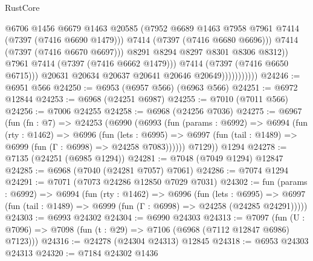 \begin{lexlean}{RustCore}
\begin{coremodule}
                                      @6706
                                      @1456
                                      @6679
                                      @1463
                                      @20585
                                      (@7952
                                        @6689
                                        @1463
                                        @7958
                                        @7961
                                        @7414
                                        (@7397 (@7416 @6690 @1479)))
                                      @7414
                                      (@7397 (@7416 @6680 @6696)))
                                    @7414
                                    (@7397 (@7416 @6670 @6697)))
                                  @8291
                                  @8294
                                  @8297
                                  @8301
                                  @8306
                                  @8312))
                              @7961
                              @7414
                              (@7397 (@7416 @6662 @1479)))
                            @7414
                            (@7397 (@7416 @6650 @6715)))
                          @20631
                          @20634
                          @20637
                          @20641
                          @20646
                          @20649)))))))))))
@24246 := @6951 @566
@24250 := @6953 (@6957 @566) (@6963 @566)
@24251 := @6972 @12844
@24253 := @6968 (@24251 @6987)
@24255 := @7010 (@7011 @566)
@24256 := @7006 @24255
@24258 := @6968 (@24256 @7036)
@24275 := @6967
    (fun (fn : @7) =>
    @24253
      (@6990
        (@6993
          (fun (params : @6992) =>
          @6994
            (fun (rty : @1462) =>
            @6996
              (fun (lets : @6995) =>
              @6997 (fun (tail : @1489) => @6999 (fun (Γ : @6998) => @24258 @7083))))))
        @7129))
    @1294
@24278 := @7135 (@24251 (@6985 @1294))
@24281 := @7048 (@7049 @1294) @12847
@24285 := @6968 (@7040 (@24281 @7057) @7061)
@24286 := @7074 @1294
@24291 := @7071 (@7073 @24286 @12850 @7029 @7031)
@24302 := fun (params : @6992) =>
  @6994
    (fun (rty : @1462) =>
    @6996
      (fun (lets : @6995) =>
      @6997 (fun (tail : @1489) => @6999 (fun (Γ : @6998) => @24258 (@24285 @24291)))))
@24303 := @6993 @24302
@24304 := @6990 @24303
@24313 := @7097
    (fun (U : @7096) => @7098 (fun (t : @29) => @7106 (@6968 (@7112 @12847 @6986) @7123)))
@24316 := @24278 (@24304 @24313) @12845
@24318 := @6953 @24303 @24313
@24320 := @7184 @24302 @1436

\end{coremodule}
\end{lexlean}
